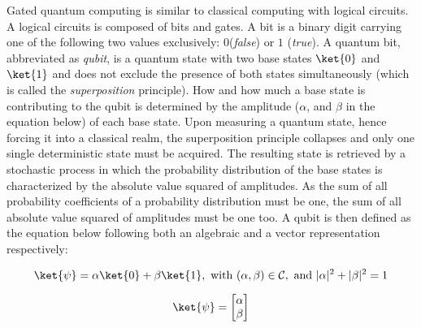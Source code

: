 \documentclass[../main.tex]{subfiles}
\begin{document}
Gated quantum computing is similar to classical computing with logical circuits. A logical circuits is composed of bits and gates. A bit is a binary digit carrying one of the following two values exclusively: $0$(\textit{false}) or $1$ (\textit{true}). A quantum bit, abbreviated as \emph{qubit}, is a quantum state with two base states $\ket{0}$ and $\ket{1}$ and does not exclude the presence of both states simultaneously (which is called the \emph{superposition} principle). How and how much a base state is contributing to the qubit is determined by the amplitude ($\alpha$, and $\beta$ in the equation below) of each base state. Upon measuring a quantum state, hence forcing it into a classical realm, the superposition principle collapses and only one single deterministic state must be acquired. The resulting state is retrieved by a stochastic process in which the probability distribution of the base states is characterized by the absolute value squared of amplitudes. As the sum of all probability coefficients of a probability distribution must be one, the sum of all absolute value squared of amplitudes must be one too. A qubit is then defined as the equation below following both an algebraic and a vector representation respectively:

\begin{equation}
    \ket{\psi} = \alpha \ket{0} + \beta \ket{1}, \, \,\text{with} \,\, (\alpha, \beta) \in \mathcal{C},
    \, \,\text{and} \, \, |\alpha|^2 + |\beta|^2 = 1   
    \label{eq: qubit_definition}
\end{equation}
 
\begin{equation}
    \ket{\psi} = \begin{bmatrix}\alpha \\ \beta \end{bmatrix}
    \label{eq: qubit_vector_representation}
\end{equation}




\biblio
\end{document}
